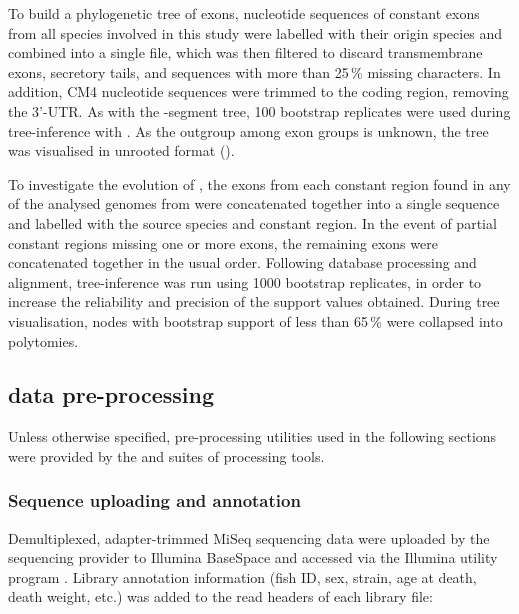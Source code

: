 
\noindent To build a phylogenetic tree of \ch exons, nucleotide sequences of constant exons from all species involved in this study were labelled with their origin species and combined into a single  file, which was then filtered to discard transmembrane exons, secretory tails, and sequences with more than 25\,\% missing characters. In addition, CM4 nucleotide sequences were trimmed to the coding region, removing the 3'-UTR. As with the \vh-segment tree, 100 bootstrap replicates were used during tree-inference with . As the outgroup among \ch exon groups is unknown, the tree was visualised in unrooted format ().


\noindent To investigate the evolution of , the  exons from each  constant region found in any of the analysed genomes from  were concatenated together into a single sequence and labelled with the source species and constant region. In the event of partial constant regions missing one or more \cz{} exons, the remaining exons were concatenated together in the usual order. Following database processing and alignment,  tree-inference was run using 1000 bootstrap replicates, in order to increase the reliability and precision of the support values obtained. During tree visualisation, nodes with bootstrap support of less than 65\,\% were collapsed into polytomies.

\subsection{\igseq data pre-processing}
\label{sec:methods_comp_igpreproc}

Unless otherwise specified, pre-processing utilities used in the following sections were provided by the  \parencite{vanderheiden2014presto} and  \parencite{gupta2015changeo} suites of \igseq processing tools.

\subsubsection{Sequence uploading and annotation}
\label{sec:methods_comp_igpreproc_annot}

Demultiplexed, adapter-trimmed MiSeq sequencing data were uploaded by the sequencing provider to Illumina BaseSpace and accessed via the Illumina utility program . Library annotation information (fish ID, sex, strain, age at death, death weight, etc.) was added to the read headers of each library  file:

